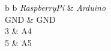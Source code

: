 \documentclass[12pt%
                    ]{report}
\begin{document}
\begin{table}[!h]
\begin{tabular}[c]{%
	b{\gnumericColA}%
	b{\gnumericColB}%
	}
\hhline{|-|-}
	 \multicolumn{1}{|p{\gnumericColA}|}%
	{\gnumericPB{\centering}\textit{RaspberryPi}}
	&\multicolumn{1}{p{\gnumericColB}|}%
	{\gnumericPB{\centering}\textit{Arduino}}
	\\
\hhline{|--|}
	{\gnumericPB{\centering}GND}
	&%
	{\gnumericPB{\centering}GND}
\\
\hhline{|--|}
	{\gnumericPB{\centering}3}
	&%
	{\gnumericPB{\centering}A4}
\\
\hhline{|--|}
	{\gnumericPB{\centering}5}
	&%
	{\gnumericPB{\centering}A5}


\end{tabular}
\end{table}
\end{document}
